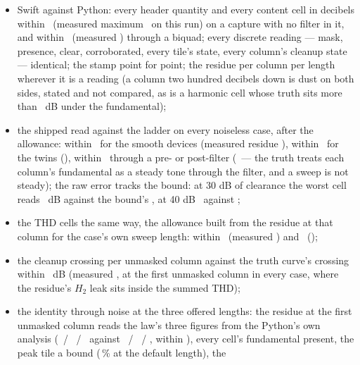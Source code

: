 \documentclass[11pt,a4paper]{article}
\begin{document}
{\sloppy
\begin{itemize}
  \item Swift against Python: every header quantity and every content
  cell in decibels within \jparitySwiftTolerance\ (measured maximum
  \jparityWorstSwift\ on this run) on a capture with no filter in it, and
  within \jparitySwiftFilteredTolerance\ (measured
  \jparityWorstSwiftFiltered) through a biquad; every discrete reading ---
  mask, presence, clear, corroborated, every tile's state, every column's
  cleanup state --- identical; the stamp point for point; the residue per
  column per length wherever it is a reading (a column two hundred
  decibels down is dust on both sides, stated and not compared, as is a
  harmonic cell whose truth sits more than \jparityEmptyDepth\ dB under the
  fundamental);
  \item the shipped read against the ladder on every noiseless case, after
  the allowance: within \jparityTruthSmooth\ for the smooth devices
  (measured residue \jparityWorstResidueSmooth), within
  \jparityTruthPhantom\ for the twins (\jparityWorstResiduePhantom), within
  \jparityTruthFiltered\ through a pre- or post-filter
  (\jparityWorstResidueFiltered\ --- the truth treats each column's
  fundamental as a steady tone through the filter, and a sweep is not
  steady); the raw error tracks the bound: at 30 dB of clearance the worst
  cell reads \jparityWorstThirty\ dB against the bound's
  \jparityBoundThirty, at 40 dB \jparityWorstForty\ against
  \jparityBoundForty;
  \item the THD cells the same way, the allowance built from the residue
  at that column for the case's own sweep length: within
  \jparityTHDSmooth\ (measured \jparityWorstTHDSmooth) and
  \jparityTHDFiltered\ (\jparityWorstTHDFiltered);
  \item the cleanup crossing per unmasked column against the truth curve's
  crossing within \jparityCleanup\ dB (measured \jparityWorstCleanup, at
  the first unmasked column in every case, where the residue's $H_2$ leak
  sits inside the summed THD);
  \item the identity through noise at the three offered lengths: the
  residue at the first unmasked column reads the law's three figures from
  the Python's own analysis (\jparityResiduePythonTwo\ /
  \jparityResiduePythonFive\ / \jparityResiduePythonTen\ against
  \jparityResidueLawTwo\ / \jparityResidueLawFive\ / \jparityResidueLawTen,
  within \jparityResidueVsLaw), every cell's fundamental present, the peak
  tile a bound (\jparityIdentityBound\,\% at the default length), the

\end{itemize}}
\end{document}
